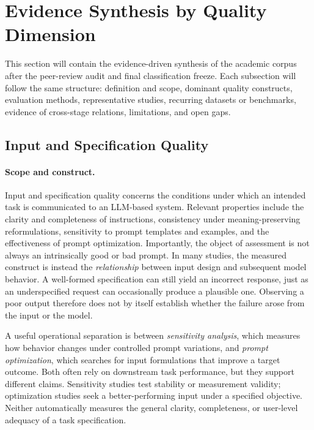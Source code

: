 \section{Evidence Synthesis by Quality Dimension}
\label{sec:dimensions}

This section will contain the evidence-driven synthesis of the academic corpus after the peer-review audit and final classification freeze. Each subsection will follow the same structure: definition and scope, dominant quality constructs, evaluation methods, representative studies, recurring datasets or benchmarks, evidence of cross-stage relations, limitations, and open gaps.

\subsection{Input and Specification Quality}
\label{sec:input-quality}

\paragraph{Scope and construct.}
Input and specification quality concerns the conditions under which an intended task is communicated to an LLM-based system. Relevant properties include the clarity and completeness of instructions, consistency under meaning-preserving reformulations, sensitivity to prompt templates and examples, and the effectiveness of prompt optimization. Importantly, the object of assessment is not always an intrinsically good or bad prompt. In many studies, the measured construct is instead the \emph{relationship} between input design and subsequent model behavior. A well-formed specification can still yield an incorrect response, just as an underspecified request can occasionally produce a plausible one. Observing a poor output therefore does not by itself establish whether the failure arose from the input or the model.

A useful operational separation is between \emph{sensitivity analysis}, which measures how behavior changes under controlled prompt variations, and \emph{prompt optimization}, which searches for input formulations that improve a target outcome. Both often rely on downstream task performance, but they support different claims. Sensitivity studies test stability or measurement validity; optimization studies seek a better-performing input under a specified objective. Neither automatically measures the general clarity, completeness, or user-level adequacy of a task specification.

